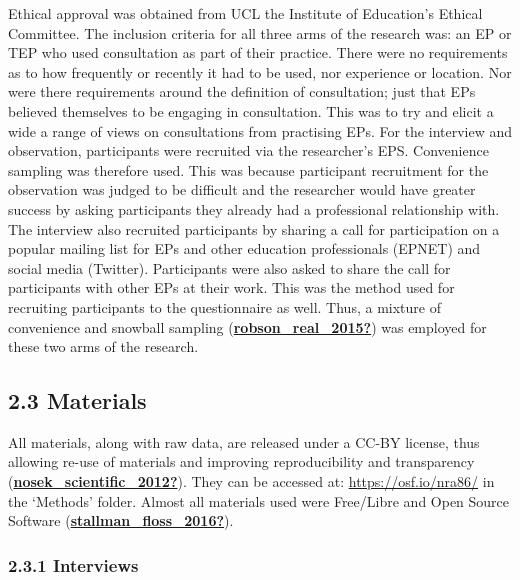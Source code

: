\documentclass[
]{article}
\begin{document}
Ethical approval was obtained from UCL the Institute of Education's
Ethical Committee. The inclusion criteria for all three arms of the
research was: an EP or TEP who used consultation as part of their
practice. There were no requirements as to how frequently or recently it
had to be used, nor experience or location. Nor were there requirements
around the definition of consultation; just that EPs believed themselves
to be engaging in consultation. This was to try and elicit a wide a
range of views on consultations from practising EPs. For the interview
and observation, participants were recruited via the researcher's EPS.
Convenience sampling was therefore used. This was because participant
recruitment for the observation was judged to be difficult and the
researcher would have greater success by asking participants they
already had a professional relationship with. The interview also
recruited participants by sharing a call for participation on a popular
mailing list for EPs and other education professionals (EPNET) and
social media (Twitter). Participants were also asked to share the call
for participants with other EPs at their work. This was the method used
for recruiting participants to the questionnaire as well. Thus, a
mixture of convenience and snowball sampling
(\protect\hyperlink{ref-robson_real_2015}{\textbf{robson\_real\_2015?}})
was employed for these two arms of the research.

\hypertarget{materials}{%
\subsection{2.3 Materials}\label{materials}}

All materials, along with raw data, are released under a CC-BY license,
thus allowing re-use of materials and improving reproducibility and
transparency
(\protect\hyperlink{ref-nosek_scientific_2012}{\textbf{nosek\_scientific\_2012?}}).
They can be accessed at: \url{https://osf.io/nra86/} in the `Methods'
folder. Almost all materials used were Free/Libre and Open Source
Software
(\protect\hyperlink{ref-stallman_floss_2016}{\textbf{stallman\_floss\_2016?}}).

\hypertarget{interviews}{%
\subsubsection{2.3.1 Interviews}\label{interviews}}
\end{document}
